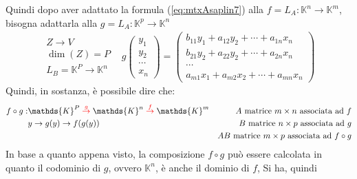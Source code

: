 \documentclass{book}
\theoremstyle{definition}
\theoremstyle{plain}
\begin{document}
Quindi dopo aver adattato la formula (\ref{eq:mtxAsaplin7}) alla $f=L_A:\mathds{K}^n\to \mathds{K}^m$, bisogna adattarla
alla $g=L_A:\mathds{K}^p\to \mathds{K}^n$
\begin{eqnarray}
  \label{eq:Compinveeproddimatrici2}
  \begin{matrix}
    Z\to V\\
    \dim(Z)=P\\
    L_B=\mathds{K}^P\to \mathds{K}^n
  \end{matrix}
  & g
  \begin{pmatrix}
    y_1\\
    y_2\\
    \cdots\\
    x_n
  \end{pmatrix}=
  \begin{pmatrix}
    b_{11}y_1+a_{12}y_2+\cdots +a_{1n}x_n\\
    b_{21}y_2+a_{22}y_2+\cdots+ a_{2n}x_n\\
    \cdots\\
    a_{m1}x_1+a_{m2}x_2+\cdots+ a_{mn}x_n
  \end{pmatrix}
\end{eqnarray}
Quindi, in sostanza, è possibile dire che:
\begin{eqnarray*}
  f\circ g: & \mathds{K}^P\overset{\color{red}g}{\to} \mathds{K}^n\overset{\color{red}f}{\to}
              \mathds{K}^m & A \text{ matrice $m\times n$ associata ad } f\\
            & y\to g(y)\to f(g(y)) &  B \text{ matrice $n\times p$ associata ad } g\\
  &&  AB \text{ matrice $m\times p$ associata ad } f\circ g
\end{eqnarray*}
In base a quanto appena visto, la composizione $f\circ g$ può essere calcolata in quanto il codominio di
$g$, ovvero $\mathds{K}^n$, è anche il dominio di $f$, Si ha, quindi
\end{document}
